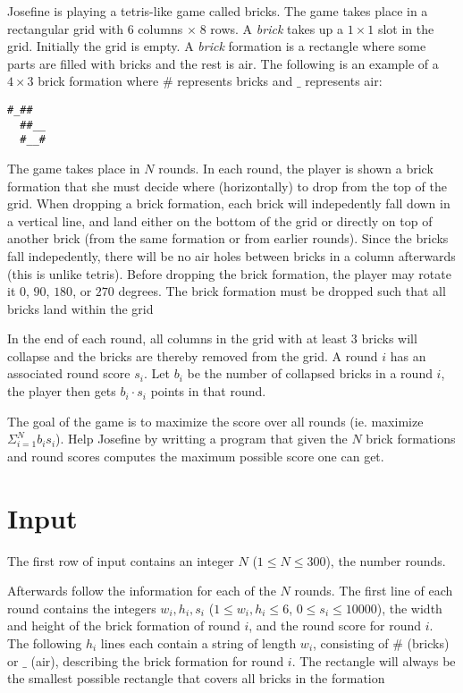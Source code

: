 \def\version{1}

Josefine is playing a tetris-like game called bricks. The game takes place in a rectangular grid
with $6$ columns $\times \; 8$ rows. A \textit{brick} takes up a $1 \times 1$ slot in the grid. Initially the grid is empty.
A \textit{brick} formation is a rectangle where some parts are filled with bricks and the rest is air.
The following is an example of a $4 \times 3$ brick formation where $\#$ represents bricks and $\_$
represents air:

\noindent
\begin{lstlisting}[basicstyle=\ttfamily]
  #_##
  ##__
  #__#
\end{lstlisting}

The game takes place in $N$ rounds. In each round, the player is shown a brick formation that
she must decide where (horizontally) to drop from the top of the grid. When dropping a brick
formation, each brick will indepedently fall down in a vertical line, and land either on the
bottom of the grid or directly on top of another brick (from the same formation or from
earlier rounds). Since the bricks fall indepedently, there will be no air holes between bricks in
a column afterwards (this is unlike tetris). Before dropping the brick formation, the player
may rotate it $0$, $90$, $180$, or $270$ degrees. The brick formation must be dropped such that all
bricks land within the grid

In the end of each round, all columns in the grid with at least $3$ bricks will collapse and the
bricks are thereby removed from the grid. A round $i$ has an associated round score $s_i$. Let $b_i$
be the number of collapsed bricks in a round $i$, the player then gets $b_i \cdot s_i$ points in that
round.

The goal of the game is to maximize the score over all rounds (ie. maximize $\Sigma_{i=1}^{N} b_i s_i$). Help
Josefine by writting a program that given the $N$ brick formations and round scores
computes the maximum possible score one can get.

\section*{Input}
\noindent
The first row of input contains an integer $N$ ($1 \leq N \leq 300$), the number rounds.

Afterwards follow the information for each of the $N$ rounds. The first line of each round contains 
the integers $w_i, h_i, s_i$ ($1 \leq w_i, h_i \leq 6$, $0 \leq s_i \leq 10000$), the width and height
of the brick formation of round $i$, and the round score for round $i$.
The following $h_i$ lines each contain a string of length $w_i$, consisting of $\#$ (bricks) or $\_$ (air), 
describing the brick formation for round $i$. The rectangle will always be the
smallest possible rectangle that covers all bricks in the formation

